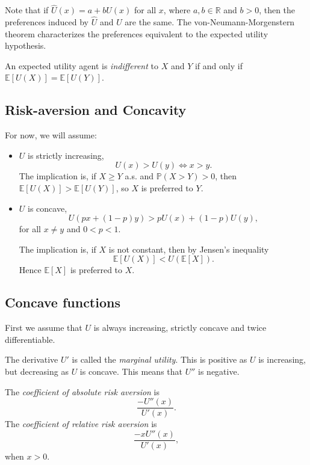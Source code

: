 \documentclass[12pt]{article}
\begin{document}
Note that if $\hat U(x) = a + bU(x)$ for all $x$, where $a, b \in \mathbb{R}$ and $b > 0$, then the preferences induced by $\hat U$ and $U$ are the same. The von-Neumann-Morgenstern theorem characterizes the preferences equivalent to the expected utility hypothesis.

\begin{definition}
	An expected utility agent is \emph{indifferent} to $X$ and $Y$ if and only if $\mathbb{E}[U(X)] = \mathbb{E}[U(Y)]$.
\end{definition}

\subsection{Risk-aversion and Concavity}

For now, we will assume:
\begin{itemize}
	\item $U$ is strictly increasing,
		 \[
		U(x) > U(y) \iff x > y.
		\]
		The implication is, if $X \geq Y$ a.s. and $\mathbb{P}(X > Y) > 0$, then $\mathbb{E}[U(X)] > \mathbb{E}[U(Y)]$, so $X$ is preferred to $Y$.
	\item $U$ is concave,
		\[
		U(px + (1-p)y) > pU(x) + (1-p)U(y),
		\]
		for all $x \neq y$ and $0 < p < 1$.

		The implication is, if $X$ is not constant, then by Jensen's inequality
		\[
		\mathbb{E}[U(X)] < U(\mathbb{E}[X]).
		\]
		Hence $\mathbb{E}[X]$ is preferred to $X$.
\end{itemize}


\subsection{Concave functions}
\label{sub:concave}

First we assume that $U$ is always increasing, strictly concave and twice differentiable.

The derivative $U'$ is called the \emph{marginal utility}. This is positive as $U$ is increasing, but decreasing as $U$ is concave. This means that $U''$ is negative.

\begin{definition}
	The \emph{coefficient of absolute risk aversion} is
	\[
	\frac{-U''(x)}{U'(x)}.
	\]
	The \emph{coefficient of relative risk aversion} is
	\[
	\frac{- x U''(x)}{U'(x)},
	\]
	when $x > 0$.
\end{definition}
\end{document}
